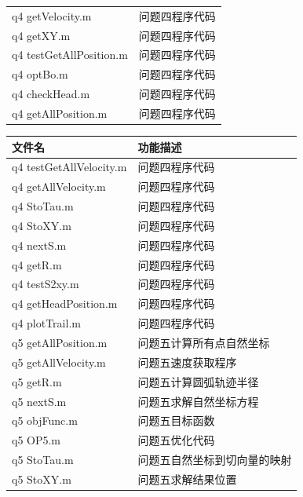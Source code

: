 \documentclass[withoutpreface,bwprint]{cumcmthesis}
\begin{document}
\begin{appendices}
\begin{table}[H]
\begin{tabularx}{\textwidth}{LL}
q4 getVelocity.m & 问题四程序代码 \\
q4 getXY.m & 问题四程序代码 \\
q4 testGetAllPosition.m & 问题四程序代码 \\
q4 optBo.m & 问题四程序代码 \\
q4 checkHead.m & 问题四程序代码 \\
q4 getAllPosition.m & 问题四程序代码 \\

\bottomrule
\end{tabularx}
\label{tab:文件列表}
\end{table}

\newpage

\begin{table}[H]
\centering
\begin{tabularx}{\textwidth}{LL}
\toprule
文件名   & 功能描述 \\
\midrule

q4 testGetAllVelocity.m & 问题四程序代码 \\
q4 getAllVelocity.m & 问题四程序代码 \\
q4 StoTau.m & 问题四程序代码 \\
q4 StoXY.m & 问题四程序代码 \\
q4 nextS.m & 问题四程序代码 \\
q4 getR.m & 问题四程序代码 \\
q4 testS2xy.m & 问题四程序代码 \\
q4 getHeadPosition.m & 问题四程序代码 \\
q4 plotTrail.m & 问题四程序代码 \\


q5 getAllPosition.m & 问题五计算所有点自然坐标 \\
q5 getAllVelocity.m & 问题五速度获取程序 \\
q5 getR.m & 问题五计算圆弧轨迹半径 \\
q5 nextS.m & 问题五求解自然坐标方程 \\
q5 objFunc.m & 问题五目标函数 \\
q5 OP5.m & 问题五优化代码 \\
q5 StoTau.m & 问题五自然坐标到切向量的映射 \\
q5 StoXY.m & 问题五求解结果位置 \\

\bottomrule
\end{tabularx}
\label{tab:文件列表}
\end{table}

\newpage


\end{appendices}
\end{document}
